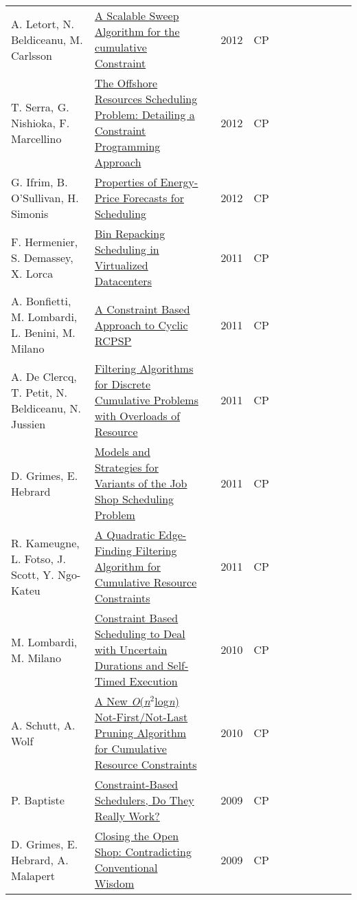\documentclass[a4paper]{article}
\begin{document}
{\begin{longtable}{p{3cm}p{6cm}rrcrlcccp{1.5cm}l}
A. Letort, N. Beldiceanu, M. Carlsson& \href{papers/LetortBC12.pdf}{A Scalable Sweep Algorithm for the cumulative Constraint} & \cite{LetortBC12} & 2012 & CP & & & & & & & \\
T. Serra, G. Nishioka, F. Marcellino& \href{papers/SerraNM12.pdf}{The Offshore Resources Scheduling Problem: Detailing a Constraint Programming Approach} & \cite{SerraNM12} & 2012 & CP & & & & & & & \\
G. Ifrim, B. O'Sullivan, H. Simonis& \href{papers/IfrimOS12.pdf}{Properties of Energy-Price Forecasts for Scheduling} & \cite{IfrimOS12} & 2012 & CP & & & & & & & \\
F. Hermenier, S. Demassey, X. Lorca& \href{papers/HermenierDL11.pdf}{Bin Repacking Scheduling in Virtualized Datacenters} & \cite{HermenierDL11} & 2011 & CP & & & & & & & \\
A. Bonfietti, M. Lombardi, L. Benini, M. Milano& \href{papers/BonfiettiLBM11.pdf}{A Constraint Based Approach to Cyclic {RCPSP}} & \cite{BonfiettiLBM11} & 2011 & CP & & & & & & & \\
A. De Clercq, T. Petit, N. Beldiceanu, N. Jussien& \href{papers/ClercqPBJ11.pdf}{Filtering Algorithms for Discrete Cumulative Problems with Overloads of Resource} & \cite{ClercqPBJ11} & 2011 & CP & & & & & & & \\
D. Grimes, E. Hebrard& \href{papers/GrimesH11.pdf}{Models and Strategies for Variants of the Job Shop Scheduling Problem} & \cite{GrimesH11} & 2011 & CP & & & & & & & \\
R. Kameugne, L. Fotso, J. Scott, Y. Ngo{-}Kateu& \href{papers/KameugneFSN11.pdf}{A Quadratic Edge-Finding Filtering Algorithm for Cumulative Resource Constraints} & \cite{KameugneFSN11} & 2011 & CP & & & & & & & \\
M. Lombardi, M. Milano& \href{papers/LombardiM10.pdf}{Constraint Based Scheduling to Deal with Uncertain Durations and Self-Timed Execution} & \cite{LombardiM10} & 2010 & CP & & & & & & & \\
A. Schutt, A. Wolf& \href{papers/SchuttW10.pdf}{A New \emph{O}(\emph{n}\({}^{\mbox{2}}\)log\emph{n}) Not-First/Not-Last Pruning Algorithm for Cumulative Resource Constraints} & \cite{SchuttW10} & 2010 & CP & & & & & & & \\
P. Baptiste& \href{papers/Baptiste09.pdf}{Constraint-Based Schedulers, Do They Really Work?} & \cite{Baptiste09} & 2009 & CP & & & & & & & \\
D. Grimes, E. Hebrard, A. Malapert& \href{papers/GrimesHM09.pdf}{Closing the Open Shop: Contradicting Conventional Wisdom} & \cite{GrimesHM09} & 2009 & CP & & & & & & & \\

\end{longtable}}
\end{document}
